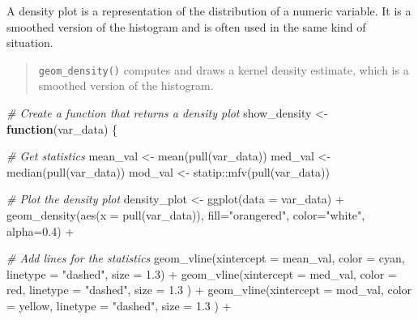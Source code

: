 \documentclass[
]{article}
\newenvironment{Shaded}{\begin{snugshade}}{\end{snugshade}}
\newcommand{\AttributeTok}[1]{\textcolor[rgb]{0.77,0.63,0.00}{#1}}
\newcommand{\CommentTok}[1]{\textcolor[rgb]{0.56,0.35,0.01}{\textit{#1}}}
\newcommand{\ControlFlowTok}[1]{\textcolor[rgb]{0.13,0.29,0.53}{\textbf{#1}}}
\newcommand{\FloatTok}[1]{\textcolor[rgb]{0.00,0.00,0.81}{#1}}
\newcommand{\FunctionTok}[1]{\textcolor[rgb]{0.00,0.00,0.00}{#1}}
\newcommand{\NormalTok}[1]{#1}
\newcommand{\OtherTok}[1]{\textcolor[rgb]{0.56,0.35,0.01}{#1}}
\newcommand{\SpecialCharTok}[1]{\textcolor[rgb]{0.00,0.00,0.00}{#1}}
\newcommand{\StringTok}[1]{\textcolor[rgb]{0.31,0.60,0.02}{#1}}
\begin{document}
A density plot is a representation of the distribution of a numeric
variable. It is a smoothed version of the histogram and is often used in
the same kind of situation.

\begin{quote}
\texttt{geom\_density()} computes and draws a kernel density estimate,
which is a smoothed version of the histogram.
\end{quote}

\begin{Shaded}
\begin{Highlighting}[]
\CommentTok{\# Create a function that returns a density plot}
\NormalTok{show\_density }\OtherTok{\textless{}{-}} \ControlFlowTok{function}\NormalTok{(var\_data) \{}
  
  \CommentTok{\# Get statistics}
\NormalTok{  mean\_val }\OtherTok{\textless{}{-}} \FunctionTok{mean}\NormalTok{(}\FunctionTok{pull}\NormalTok{(var\_data))}
\NormalTok{  med\_val }\OtherTok{\textless{}{-}} \FunctionTok{median}\NormalTok{(}\FunctionTok{pull}\NormalTok{(var\_data))}
\NormalTok{  mod\_val }\OtherTok{\textless{}{-}}\NormalTok{ statip}\SpecialCharTok{::}\FunctionTok{mfv}\NormalTok{(}\FunctionTok{pull}\NormalTok{(var\_data))}
  
  
  \CommentTok{\# Plot the density plot}
\NormalTok{  density\_plot }\OtherTok{\textless{}{-}} \FunctionTok{ggplot}\NormalTok{(}\AttributeTok{data =}\NormalTok{ var\_data) }\SpecialCharTok{+}
  \FunctionTok{geom\_density}\NormalTok{(}\FunctionTok{aes}\NormalTok{(}\AttributeTok{x =} \FunctionTok{pull}\NormalTok{(var\_data)), }\AttributeTok{fill=}\StringTok{"orangered"}\NormalTok{, }\AttributeTok{color=}\StringTok{"white"}\NormalTok{, }\AttributeTok{alpha=}\FloatTok{0.4}\NormalTok{) }\SpecialCharTok{+}
    
  \CommentTok{\# Add lines for the statistics}
  \FunctionTok{geom\_vline}\NormalTok{(}\AttributeTok{xintercept =}\NormalTok{ mean\_val, }\AttributeTok{color =} \StringTok{\textquotesingle{}cyan\textquotesingle{}}\NormalTok{, }\AttributeTok{linetype =} \StringTok{"dashed"}\NormalTok{, }\AttributeTok{size =} \FloatTok{1.3}\NormalTok{) }\SpecialCharTok{+}
  \FunctionTok{geom\_vline}\NormalTok{(}\AttributeTok{xintercept =}\NormalTok{ med\_val, }\AttributeTok{color =} \StringTok{\textquotesingle{}red\textquotesingle{}}\NormalTok{, }\AttributeTok{linetype =} \StringTok{"dashed"}\NormalTok{, }\AttributeTok{size =} \FloatTok{1.3}\NormalTok{ ) }\SpecialCharTok{+}
  \FunctionTok{geom\_vline}\NormalTok{(}\AttributeTok{xintercept =}\NormalTok{ mod\_val, }\AttributeTok{color =} \StringTok{\textquotesingle{}yellow\textquotesingle{}}\NormalTok{, }\AttributeTok{linetype =} \StringTok{"dashed"}\NormalTok{, }\AttributeTok{size =} \FloatTok{1.3}\NormalTok{ ) }\SpecialCharTok{+}
    

\end{Highlighting}
\end{Shaded}
\end{document}
